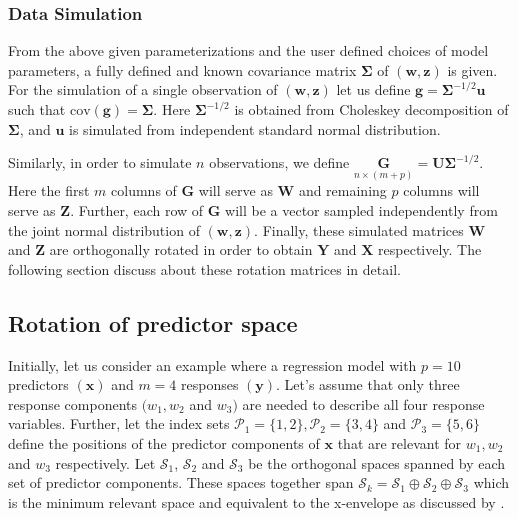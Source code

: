 \documentclass[review]{elsarticle}
\theoremstyle{definition}
\theoremstyle{definition}
\theoremstyle{definition}
\theoremstyle{remark}
\begin{document}
\subsubsection{Data Simulation}\label{data-simulation}

From the above given parameterizations and the user defined choices of
model parameters, a fully defined and known covariance matrix
\(\boldsymbol{\Sigma}\) of \((\mathbf{w, z})\) is given. For the
simulation of a single observation of \((\mathbf{w, z})\) let us define
\(\mathbf{g} = \boldsymbol{\Sigma}^{-1/2}\mathbf{u}\) such that
\(\text{cov}(\mathbf{g}) = \boldsymbol{\Sigma}\). Here
\(\boldsymbol{\Sigma}^{-1/2}\) is obtained from Choleskey decomposition
of \(\boldsymbol{\Sigma}\), and \(\mathbf{u}\) is simulated from
independent standard normal distribution.

Similarly, in order to simulate \(n\) observations, we define
\(\underset{n \times (m + p)}{\mathbf{G}} = \mathbf{U}\boldsymbol{\Sigma}^{-1/2}\).
Here the first \(m\) columns of \(\mathbf{G}\) will serve as
\(\mathbf{W}\) and remaining \(p\) columns will serve as \(\mathbf{Z}\).
Further, each row of \(\mathbf{G}\) will be a vector sampled
independently from the joint normal distribution of
\(\left(\mathbf{w}, \mathbf{z}\right)\). Finally, these simulated
matrices \(\mathbf{W}\) and \(\mathbf{Z}\) are orthogonally rotated in
order to obtain \(\mathbf{Y}\) and \(\mathbf{X}\) respectively. The
following section discuss about these rotation matrices in detail.

\subsection{Rotation of predictor
space}\label{rotation-of-predictor-space}

Initially, let us consider an example where a regression model with
\(p = 10\) predictors \((\mathbf{x})\) and \(m = 4\) responses
\((\mathbf{y})\). Let's assume that only three response components
\((w_1, w_2\) and \(w_3)\) are needed to describe all four response
variables. Further, let the index sets
\(\mathcal{P}_1 = \{1, 2\}, \mathcal{P}_2 = \{3, 4\}\) and
\(\mathcal{P}_3 = \{5, 6\}\) define the positions of the predictor
components of \(\mathbf{x}\) that are relevant for \(w_1, w_2\) and
\(w_3\) respectively. Let \(\mathcal{S}_1\), \(\mathcal{S}_2\) and
\(\mathcal{S}_3\) be the orthogonal spaces spanned by each set of
predictor components. These spaces together span
\(\mathcal{S}_k = \mathcal{S}_1 \oplus \mathcal{S}_2 \oplus \mathcal{S}_3\)
which is the minimum relevant space and equivalent to the x-envelope as
discussed by \citet{cook2013envelopes}.
\end{document}
